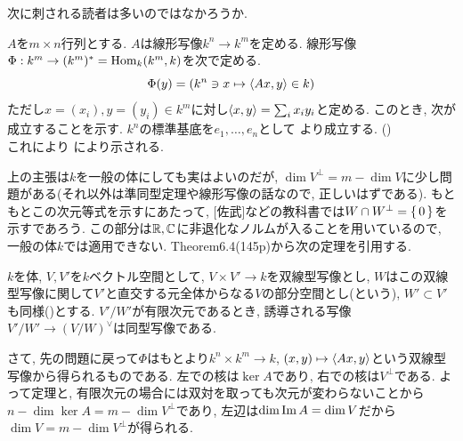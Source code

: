 次に刺される読者は多いのではなかろうか.
\begin{egans}
$A$を$m\times n$行列とする. $A$は線形写像$k^n \to k^m$を定める. 線形写像$\Phi:k^m \to (k^m)^{\ast} = \mathrm{Hom}_{k}(k^m,k)$を次で定める.
\[\Phi(y) = (k^n\ni x\mapsto \langle Ax,y \rangle \in k)\]
ただし$x=(x_i), y=(y_i)\in k^m$に対し$\langle x,y\rangle = \sum_{i} x_iy_i$と定める. このとき, 次が成立することを示す.
\prf $k^n$の標準基底を$e_1,\dots, e_n$として
より成立する. ()\\
これにより
により示される.
\end{egans}

{\small
\begin{rem} 上の主張は$k$を一般の体にしても実はよいのだが, $\dim{V^{\bot}} = m - \dim{V}$に少し問題がある(それ以外は準同型定理や線形写像の話なので, 正しいはずである). もともとこの次元等式を示すにあたって, [佐武]などの教科書では$W\cap W^{\bot} = \set{0}$を示すであろう. この部分は$\mathbb{R},\mathbb{C}$に非退化なノルムが入ることを用いているので, 一般の体$k$では適用できない. \cite{SLA} Theorem6.4(145p)から次の定理を引用する.
\begin{theo} $k$を体, $V,V'$を$k$ベクトル空間として,
$V\times V'\to k$を双線型写像とし, $W$はこの双線型写像に関して$V'$と直交する元全体からなる$V$の部分空間とし(という), $W'\subset V'$も同様()とする. $V'/W'$が有限次元であるとき, 誘導される写像$V'/W'\to (V/W)^{\lor}$は同型写像である.
\end{theo}
さて, 先の問題に戻って$\Phi$はもとより$k^n\times k^m \to k$, $(x,y)\mapsto \langle Ax,y\rangle$という双線型写像から得られるものである. 左での核は$\ker{A}$であり, 右での核は$V^{\bot}$である. よって定理と, 有限次元の場合には双対を取っても次元が変わらないことから$n-\dim{\ker{A}} = m - \dim{V^{\bot}}$であり, 左辺は$\dim{\mathrm{Im}\,A} = \dim{V}$だから$\dim{V} = m - \dim{V^{\bot}}$が得られる.
\end{rem}
}



